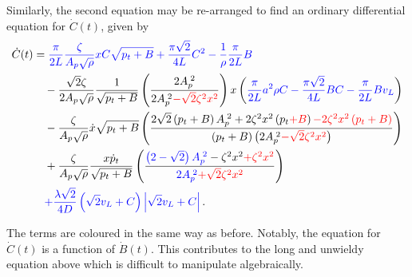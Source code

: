 Similarly, the second equation may be re-arranged to find an ordinary differential equation for $\dot{C}(t)$, given by
~
\begin{equation} \label{eq: QWMFullDiffC}
\begin{split}
    \dot{C}(t) &=
    \textcolor{Blue}{
    \frac{\pi}{2L} \frac{\zeta}{A_p \sqrt{\rho}} x C \sqrt{p_t + B}
    + \frac{\pi \sqrt{2}}{4 L} C^2
    - \frac{1}{\rho} \frac{\pi}{2L} B
    } \\ & \quad %
    - \frac{\sqrt{2} \zeta}{2 A_p \sqrt{\rho}} \frac{1}{\sqrt{p_t+B}} \left( \frac{2 A_p\power{2}}{2 A_p\power{2} \textcolor{Red}{- \sqrt{2} \zeta^2 x^2}} \right) x \left(
    \textcolor{Blue}{
    \frac{\pi}{2L} a^2 \rho C
    - \frac{\pi \sqrt{2}}{4 L} B C
    - \frac{\pi}{2L} B v_L }
    \right)
    \\ & \quad %
    - \frac{\zeta}{A_p \sqrt{\rho}} \dot{x} \sqrt{p_t + B} \left( 
    \frac{ 2 \sqrt{2} \left( p_t + B \right) A_p\power{2} + 2 \zeta^2 x^2 \left( p_t \textcolor{red}{+ B} \right) \textcolor{Red}{- 2 \zeta^2 x^2 \left( p_t + B \right)} }
    { \left( p_t + B \right) \left( 2 A_p\power{2} \textcolor{Red}{- \sqrt{2} \zeta^2 x^2} \right) }
    \right)
    \\ & \quad %
    + \frac{\zeta}{A_p \sqrt{\rho}} \frac{x \dot{p}_t}{\sqrt{p_t+B}} \left( \frac{
    \textcolor{Blue}{\left( 2 - \sqrt{2} \right) A_p\power{2}}
    - \zeta^2 x^2 \textcolor{Red}{+ \zeta^2 x^2}}{
    \textcolor{Blue}{2 A_p\power{2}}
    \textcolor{Red}{+ \sqrt{2} \zeta^2 x^2}} \right)
    \\ & \quad %
    \textcolor{Blue}{
    + \frac{\lambda \sqrt{2}}{4 D} \left( \sqrt{2} v_L + C \right) \left| \sqrt{2} v_L + C \right| } \, .
\end{split}
\end{equation}

The terms are coloured in the same way as before. Notably, the equation for $\dot{C}(t)$ is a function of $\dot{B}(t)$. This contributes to the long and unwieldy equation above which is difficult to manipulate algebraically.



